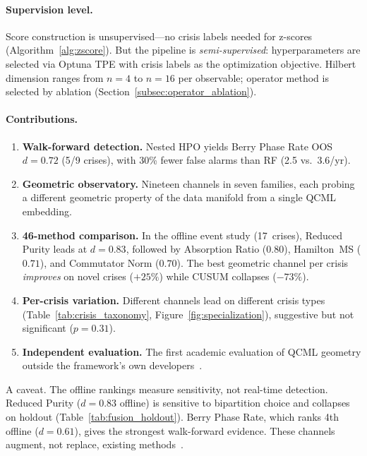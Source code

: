 \documentclass[3p]{elsarticle}
\begin{document}
\paragraph{Supervision level.}
Score construction is unsupervised---no crisis labels needed for
z-scores (Algorithm~\ref{alg:zscore}).  But the pipeline is
\emph{semi-supervised}: hyperparameters are selected via Optuna TPE
with crisis labels as the optimization objective.  Hilbert dimension
ranges from $n = 4$ to $n = 16$ per observable; operator method is
selected by ablation (Section~\ref{subsec:operator_ablation}).

\paragraph{Contributions.}
\begin{enumerate}
\item \textbf{Walk-forward detection.}  Nested HPO yields Berry Phase
  Rate OOS $d = 0.72$ (5/9 crises), with 30\% fewer false alarms than
  RF (2.5 vs.\ 3.6/yr).

\item \textbf{Geometric observatory.}  Nineteen channels in seven
  families, each probing a different geometric property of the data
  manifold from a single QCML embedding.

\item \textbf{46-method comparison.}  In the offline event study
  (17~crises), Reduced Purity leads at $d = 0.83$, followed by
  Absorption Ratio ($0.80$), Hamilton~MS ($0.71$), and Commutator
  Norm ($0.70$).  The best geometric channel per crisis
  \emph{improves} on novel crises ($+25\%$) while CUSUM collapses
  ($-73\%$).

\item \textbf{Per-crisis variation.}  Different channels lead on
  different crisis types
  (Table~\ref{tab:crisis_taxonomy}, Figure~\ref{fig:specialization}),
  suggestive but not significant ($p = 0.31$).

\item \textbf{Independent evaluation.}  The first academic evaluation
  of QCML geometry outside the framework's own
  developers~\cite{candelori2025,abanov2025,musaelian2024,samson2024}.
\end{enumerate}

\noindent A caveat.  The offline rankings measure sensitivity, not
real-time detection.  Reduced Purity ($d = 0.83$ offline) is sensitive
to bipartition choice and collapses on holdout
(Table~\ref{tab:fusion_holdout}).  Berry Phase Rate, which ranks 4th
offline ($d = 0.61$), gives the strongest walk-forward evidence.
These channels augment, not replace, existing
methods~\cite{timmermann2006,bates_granger1969}.
\end{document}

